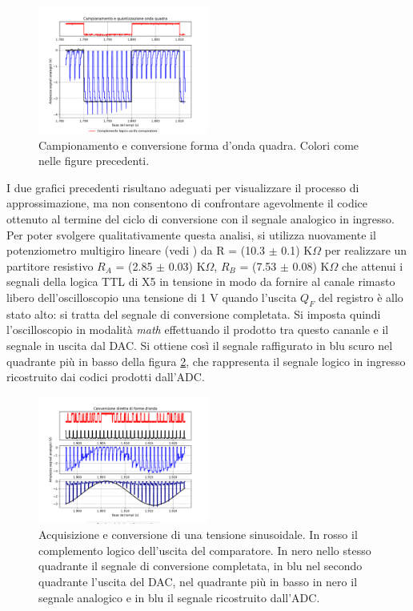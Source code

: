 \documentclass[journal]{IEEEtran}
\begin{document}
\begin{figure}[H]%
\begin{center}
\includegraphics[trim = {0 25 0 0},clip, width=0.50\textwidth]{analysis/output/square_wave_aq.pdf}
\caption{Campionamento e conversione forma d'onda quadra. Colori come nelle figure precedenti.}
\label{fig:Square_wave_aquisition}
\end{center}
\end{figure}

I due grafici precedenti risultano adeguati per visualizzare il processo di approssimazione, ma non consentono di confrontare agevolmente il codice ottenuto al termine del ciclo di conversione con il segnale analogico in ingresso. Per poter svolgere qualitativamente questa analisi, si utilizza nuovamente il potenziometro multigiro lineare (vedi \cite{K}) da R = (10.3 $\pm$ 0.1) K$\Omega$ per realizzare un partitore resistivo $R_A$ = (2.85 $\pm$ 0.03) K$\Omega$, $R_B$ = (7.53 $\pm$ 0.08) K$\Omega$ che attenui i segnali della logica TTL di X5 in tensione in modo da fornire al canale rimasto libero dell'oscilloscopio una tensione di 1 V quando l'uscita $Q_F$ del registro è allo stato alto: si tratta del segnale di conversione completata. Si imposta quindi l'oscilloscopio in modalità \textit{math} effettuando il prodotto tra questo cananle e il segnale in uscita dal DAC. Si ottiene così il segnale raffigurato in blu scuro nel quadrante più in basso della figura \ref{fig:Direct_aq_waveforms}, che rappresenta il segnale logico in ingresso ricostruito dai codici prodotti dall'ADC. 

\begin{figure}[H]%
\begin{center}
\includegraphics[trim = {0 25 0 0},clip, width=0.50\textwidth]{analysis/output/direct_aq_waveforms.pdf}
\caption{Acquisizione e conversione di una tensione sinusoidale. In rosso il complemento logico dell'uscita del comparatore. In nero nello stesso quadrante il segnale di conversione completata, in blu nel secondo quadrante l'uscita del DAC, nel quadrante più in basso in nero il segnale analogico e in blu il segnale ricostruito dall'ADC.}
\label{fig:Direct_aq_waveforms}
\end{center}
\end{figure}
\end{document}
